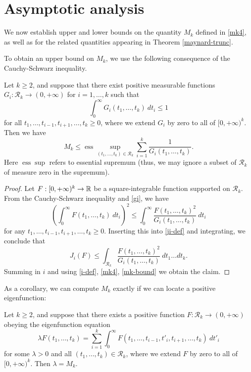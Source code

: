 \section{Asymptotic analysis}\label{asymptotics-sec}

We now establish upper and lower bounds on the quantity $M_k$ defined in \eqref{mk4}, as well as for the related quantities appearing in Theorem \ref{maynard-trunc}.

To obtain an upper bound on $M_k$, we use the following consequence of the Cauchy-Schwarz inequality.

\begin{lemma}\label{cs}  Let $k \geq 2$, and suppose that there exist positive measurable functions $G_i: {\mathcal R}_k \to (0,+\infty)$ for $i=1,\dots,k$ such that
\begin{equation}\label{gi}
 \int_0^\infty G_i(t_1,\dots,t_k)\ dt_i \leq 1
\end{equation}
for all $t_1,\dots,t_{i-1},t_{i+1},\dots,t_k \geq 0$, where we extend $G_i$ by zero to all of $[0,+\infty)^k$.  Then we have
\begin{equation}\label{mk-bound}
M_k \leq \operatorname{ess} \sup_{(t_1,\dots,t_k) \in {\mathcal R}_k} \sum_{i=1}^k \frac{1}{G_i(t_1,\dots,t_k)}.
\end{equation}
Here $\operatorname{ess} \sup$ refers to essential supremum (thus, we may ignore a subset of ${\mathcal R}_k$ of measure zero in the supremum).
\end{lemma}

\begin{proof}  Let $F: [0,+\infty)^k \to \mathbb{R}$ be a square-integrable function supported on ${\mathcal R}_k$.  From the Cauchy-Schwarz inequality and \eqref{gi}, we have
$$ \left(\int_0^\infty F(t_1,\dots,t_k)\ dt_i\right)^2 \leq \int_0^\infty \frac{F(t_1,\dots,t_k)^2}{G_i(t_1,\dots,t_k)} \ dt_i$$
for any $t_1,\dots,t_{i-1},t_{i+1},\dots,t_k \geq 0$. Inserting this into \eqref{ji-def} and integrating, we conclude that
$$ J_i(F) \leq \int_{{\mathcal R}_k} \frac{F(t_1,\dots,t_k)^2 }{G_i(t_1,\dots,t_k)}\ dt_1\dots dt_k.$$
Summing in $i$ and using \eqref{i-def}, \eqref{mk4}, \eqref{mk-bound} we obtain the claim.
\end{proof}

As a corollary, we can compute $M_k$ exactly if we can locate a positive eigenfunction:

\begin{corollary}\label{ef}  Let $k \geq 2$, and suppose that there exists a positive function $F: {\mathcal R}_k \to (0,+\infty)$ obeying the eigenfunction equation
\begin{equation}\label{lf}
 \lambda F(t_1,\dots,t_k) = \sum_{i=1}^k \int_0^\infty F(t_1,\dots,t_{i-1},t'_i, t_{i+1},\dots,t_k)\ dt'_i
\end{equation}
for some $\lambda > 0$ and all $(t_1,\dots,t_k) \in {\mathcal R}_k$, where we extend $F$ by zero to all of $[0,+\infty)^k$.  Then $\lambda = M_k$.
\end{corollary}

